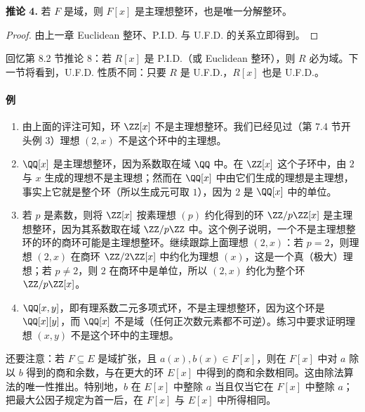 \noindent\textbf{推论 4.} 若 $F$ 是域，则 $F[x]$ 是主理想整环，也是唯一分解整环。

\begin{proof}
	由上一章 Euclidean 整环、P.I.D. 与 U.F.D. 的关系立即得到。
\end{proof}

回忆第 8.2 节推论 8：若 $R[x]$ 是 P.I.D.（或 Euclidean 整环），则 $R$ 必为域。下一节将看到，U.F.D. 性质不同：只要 $R$ 是 U.F.D.，$R[x]$ 也是 U.F.D.。

\paragraph{例}
\begin{enumerate}[label=(\arabic*)]
	\item 由上面的评注可知，环 $\ZZ[x]$ 不是主理想整环。我们已经见过（第 7.4 节开头例 3）理想 $(2,x)$ 不是这个环中的主理想。
	\item $\QQ[x]$ 是主理想整环，因为系数取在域 $\QQ$ 中。在 $\ZZ[x]$ 这个子环中，由 $2$ 与 $x$ 生成的理想不是主理想；然而在 $\QQ[x]$ 中由它们生成的理想是主理想，事实上它就是整个环（所以生成元可取 $1$），因为 $2$ 是 $\QQ[x]$ 中的单位。
	\item 若 $p$ 是素数，则将 $\ZZ[x]$ 按素理想 $(p)$ 约化得到的环 $\ZZ/p\ZZ[x]$ 是主理想整环，因为其系数取在域 $\ZZ/p\ZZ$ 中。这个例子说明，一个不是主理想整环的环的商环可能是主理想整环。继续跟踪上面理想 $(2,x)$：若 $p=2$，则理想 $(2,x)$ 在商环 $\ZZ/2\ZZ[x]$ 中约化为理想 $(x)$，这是一个真（极大）理想；若 $p\neq2$，则 $2$ 在商环中是单位，所以 $(2,x)$ 约化为整个环 $\ZZ/p\ZZ[x]$。
	\item $\QQ[x,y]$，即有理系数二元多项式环，不是主理想整环，因为这个环是 $\QQ[x][y]$，而 $\QQ[x]$ 不是域（任何正次数元素都不可逆）。练习中要求证明理想 $(x,y)$ 不是这个环中的主理想。
\end{enumerate}

还要注意：若 $F\subseteq E$ 是域扩张，且 $a(x),b(x)\in F[x]$，则在 $F[x]$ 中对 $a$ 除以 $b$ 得到的商和余数，与在更大的环 $E[x]$ 中得到的商和余数相同。这由除法算法的唯一性推出。特别地，$b$ 在 $E[x]$ 中整除 $a$ 当且仅当它在 $F[x]$ 中整除 $a$；把最大公因子规定为首一后，在 $F[x]$ 与 $E[x]$ 中所得相同。


